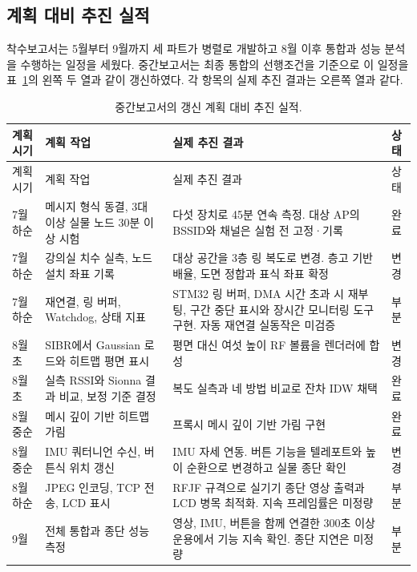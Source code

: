\documentclass[11pt,a4paper]{article}
\begin{document}
\FloatBarrier
\subsection{계획 대비 추진 실적}

착수보고서는 5월부터 9월까지 세 파트가 병렬로 개발하고 8월 이후 통합과 성능 분석을 수행하는 일정을 세웠다.
중간보고서는 최종 통합의 선행조건을 기준으로 이 일정을 표~\ref{tab:plan}의 왼쪽 두 열과 같이 갱신하였다.
각 항목의 실제 추진 결과는 오른쪽 열과 같다.

{\small
\renewcommand{\arraystretch}{1.2}
\begin{longtable}{@{}>{\raggedright\arraybackslash}p{1.6cm}
  >{\raggedright\arraybackslash}p{4.6cm}
  >{\raggedright\arraybackslash}p{7.0cm}
  >{\centering\arraybackslash}p{1.3cm}@{}}
\caption{중간보고서의 갱신 계획 대비 추진 실적.}\label{tab:plan}\\
\toprule
계획 시기 & 계획 작업 & 실제 추진 결과 & 상태 \\
\midrule
\endfirsthead
\toprule
계획 시기 & 계획 작업 & 실제 추진 결과 & 상태 \\
\midrule
\endhead
\bottomrule
\endfoot
7월 하순 & 메시지 형식 동결, 3대 이상 실물 노드 30분 이상 시험 & 다섯 장치로 45분 연속 측정. 대상 AP의 BSSID와 채널은 실험 전 고정·기록 & 완료 \\
7월 하순 & 강의실 치수 실측, 노드 설치 좌표 기록 & 대상 공간을 3층 링 복도로 변경. 층고 기반 배율, 도면 정합과 표식 좌표 확정 & 변경 \\
7월 하순 & 재연결, 링 버퍼, Watchdog, 상태 지표 & STM32 링 버퍼, DMA 시간 초과 시 재부팅, 구간 중단 표시와 장시간 모니터링 도구 구현. 자동 재연결 실동작은 미검증 & 부분 \\
8월 초 & SIBR에서 Gaussian 로드와 히트맵 평면 표시 & 평면 대신 여섯 높이 RF 볼륨을 렌더러에 합성 & 변경 \\
8월 초 & 실측 RSSI와 Sionna 결과 비교, 보정 기준 결정 & 복도 실측과 네 방법 비교로 잔차 IDW 채택 & 완료 \\
8월 중순 & 메시 깊이 기반 히트맵 가림 & 프록시 메시 깊이 기반 가림 구현 & 완료 \\
8월 중순 & IMU 쿼터니언 수신, 버튼식 위치 갱신 & IMU 자세 연동. 버튼 기능을 텔레포트와 높이 순환으로 변경하고 실물 종단 확인 & 변경 \\
8월 하순 & JPEG 인코딩, TCP 전송, LCD 표시 & RFJF 규격으로 실기기 종단 영상 출력과 LCD 병목 최적화. 지속 프레임률은 미정량 & 부분 \\
9월 & 전체 통합과 종단 성능 측정 & 영상, IMU, 버튼을 함께 연결한 300초 이상 운용에서 기능 지속 확인. 종단 지연은 미정량 & 부분 \\
\end{longtable}
}
\end{document}
